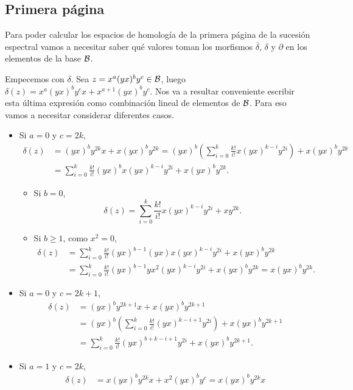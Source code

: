 \documentclass[fleqn,../tesis.tex]{subfiles}
\begin{document}
\subsection{Primera página}
Para poder calcular los espacios de homología de la primera página de la sucesión espectral
vamos a necesitar saber qué valores toman los morfismos $\overline{\delta}$, $\delta$ y $\partial$
en los elementos de la base $\mathcal{B}$.

Empecemos con $\delta$. Sea $z = x^a(yx)^by^c \in \mathcal{B}$, luego $\delta(z) = x^a(yx)^by^cx + x^{a + 1}(yx)^by^c$. Nos va a
resultar conveniente escribir esta última expresión como combinación lineal de elementos de $\mathcal{B}$. Para eso vamos a necesitar considerar
diferentes casos.
\begin{itemize}
\item Si $a = 0$ y $c = 2k$,
\begin{align*}
	\delta(z) &= (yx)^by^{2k}x + x(yx)^by^{2k} = (yx)^b\left( \sum_{i = 0}^k\frac{k!}{i!}x(yx)^{k - i}y^{2i}\right) + x(yx)^by^{2k} \\
	&= \sum_{i = 0}^k\frac{k!}{i!}(yx)^bx(yx)^{k - i}y^{2i} + x(yx)^by^{2k}. 
\end{align*}
\begin{itemize}
\item Si $b = 0$,
\[
	\delta(z) = \sum_{i = 0}^k\frac{k!}{i!}x(yx)^{k - i}y^{2i} + xy^{2k}.
\]
\item Si $b \geq 1$, como $x^2 = 0$,
\begin{align*}
	\delta(z) &= \sum_{i = 0}^k\frac{k!}{i!}(yx)^{b-1}(yx)x(yx)^{k - i}y^{2i} + x(yx)^by^{2k} \\
	&= \sum_{i = 0}^k\frac{k!}{i!}(yx)^{b-1}yx^2(yx)^{k - i}y^{2i} + x(yx)^by^{2k} = x(yx)^by^{2k}.
\end{align*}
\end{itemize}
\item Si $a = 0$ y $c = 2k + 1$,
\begin{align*}
	\delta(z) &= (yx)^by^{2k + 1}x + x(yx)^by^{2k + 1} \\
	&= (yx)^b\left( \sum_{i = 0}^k\frac{k!}{i!}(yx)^{k - i + 1}y^{2i}\right) + x(yx)^by^{2k + 1} \\
	&= \sum_{i = 0}^k\frac{k!}{i!}(yx)^{b + k - i + 1}y^{2i} + x(yx)^by^{2k + 1}.
\end{align*}
\item Si $a = 1$ y $c = 2k$,
	\begin{align*}
		\delta(z) &= x(yx)^by^{2k}x + x^2(yx)^by^c = x(yx)^by^{2k}x \\

\end{align*}
\end{itemize}
\end{document}
